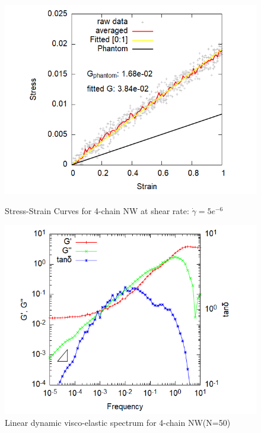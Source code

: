 \documentclass[uplatex,dvipdfmx,a4paper,10pt]{jsarticle}
\begin{document}
\vspace{-1mm}
\begin{figure}[hb]
\begin{minipage}{0.33\hsize}
    \begin{center}
        \includegraphics[width=.9\textwidth]{4chain_N50_shear.png}
        \caption{Stress-Strain Curves for 4-chain NW at shear rate: $\dot{\gamma} = 5e^{-6}$}
        \label{fig:shear}
	\end{center}
\end{minipage}
\begin{minipage}{0.33\hsize}
	\begin{center}
        \includegraphics[width=.9\textwidth]{gw_4chain_N50_stepstretch.png}
        \caption{Linear dynamic visco-elastic spectrum for 4-chain NW(N=50)}
        \label{fig:spectrum}
	\end{center}
\end{minipage}

\end{figure}
\end{document}
